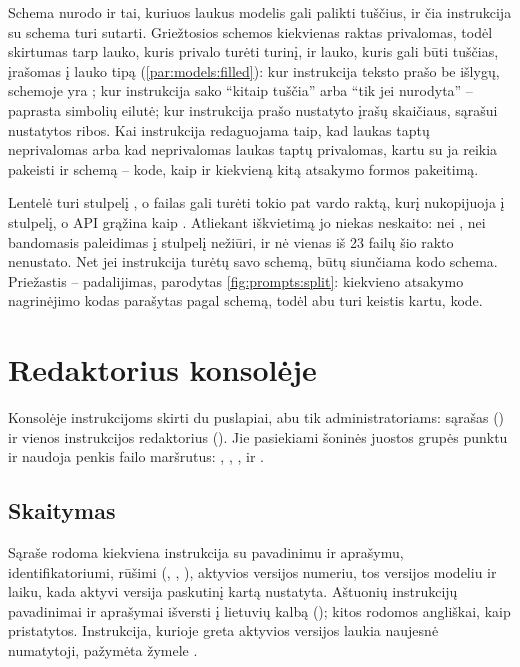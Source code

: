 Schema nurodo ir tai, kuriuos laukus modelis gali palikti tuščius, ir čia instrukcija su schema
turi sutarti. Griežtosios schemos kiekvienas raktas privalomas, todėl skirtumas tarp lauko,
kuris privalo turėti turinį, ir lauko, kuris gali būti tuščias, įrašomas į lauko tipą
(\cref{par:models:filled}): kur instrukcija teksto prašo be išlygų, schemoje yra
; kur instrukcija sako \enquote{kitaip tuščia} arba \enquote{tik jei nurodyta} --
paprasta simbolių eilutė; kur instrukcija prašo nustatyto įrašų skaičiaus, sąrašui nustatytos
ribos. Kai instrukcija redaguojama taip, kad laukas taptų neprivalomas arba kad neprivalomas
laukas taptų privalomas, kartu su ja reikia pakeisti ir schemą -- kode, kaip ir kiekvieną kitą
atsakymo formos pakeitimą.

Lentelė  turi stulpelį , o failas gali turėti tokio pat vardo
raktą, kurį  nukopijuoja į stulpelį, o API grąžina kaip
. Atliekant iškvietimą jo niekas neskaito: nei , nei
bandomasis paleidimas į stulpelį nežiūri, ir nė vienas iš 23 failų šio rakto nenustato. Net
jei instrukcija turėtų savo schemą, būtų siunčiama kodo schema. Priežastis -- padalijimas,
parodytas \cref{fig:prompts:split}: kiekvieno atsakymo nagrinėjimo kodas parašytas pagal schemą,
todėl abu turi keistis kartu, kode.


\section{Redaktorius konsolėje}\label{sec:prompts:editor}

Konsolėje instrukcijoms skirti du puslapiai, abu tik administratoriams: sąrašas
() ir vienos instrukcijos redaktorius
(). Jie pasiekiami šoninės juostos grupės
 punktu  ir naudoja penkis failo
 maršrutus:
, ,
,
 ir
.

\subsection{Skaitymas}\label{sec:prompts:reading}

Sąraše rodoma kiekviena instrukcija su pavadinimu ir aprašymu, identifikatoriumi, rūšimi
(, , ), aktyvios versijos numeriu, tos
versijos modeliu ir laiku, kada aktyvi versija paskutinį kartą nustatyta. Aštuonių instrukcijų
pavadinimai ir aprašymai išversti į lietuvių kalbą ();
kitos rodomos angliškai, kaip pristatytos. Instrukcija, kurioje greta aktyvios versijos laukia
naujesnė numatytoji, pažymėta žymele .

